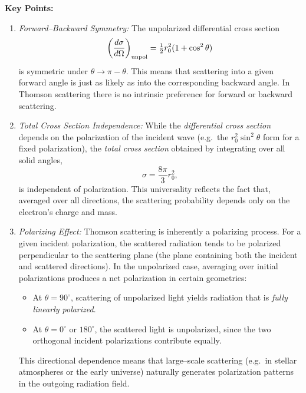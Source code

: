 \begin{remark}
    \textbf{Key Points:}
    \begin{enumerate}
        \item \emph{Forward--Backward Symmetry:}  
              The unpolarized differential cross section
              \[
                  \left(\frac{d\sigma}{d\Omega}\right)_{\rm unpol}
                  = \tfrac{1}{2} r_0^2 (1 + \cos^2\theta)
              \]
              is symmetric under $\theta \to \pi - \theta$. This means
              that scattering into a given forward angle is just as
              likely as into the corresponding backward angle. In
              Thomson scattering there is no intrinsic preference for
              forward or backward scattering.

        \item \emph{Total Cross Section Independence:}  
              While the \emph{differential cross section} depends on the
              polarization of the incident wave (e.g.~the
              $r_0^2 \sin^2\theta$ form for a fixed polarization),
              the \emph{total cross section} obtained by integrating over
              all solid angles,
              \[
                  \sigma = \frac{8\pi}{3}r_0^2,
              \]
              is independent of polarization. This universality reflects
              the fact that, averaged over all directions, the scattering
              probability depends only on the electron’s charge and mass.

        \item \emph{Polarizing Effect:}  
              Thomson scattering is inherently a polarizing process. For
              a given incident polarization, the scattered radiation
              tends to be polarized perpendicular to the scattering plane
              (the plane containing both the incident and scattered
              directions). In the unpolarized case, averaging over
              initial polarizations produces a net polarization in
              certain geometries:
              \begin{itemize}
                  \item At $\theta = 90^\circ$, scattering of unpolarized
                        light yields radiation that is \emph{fully
                        linearly polarized}.
                  \item At $\theta = 0^\circ$ or $180^\circ$, the
                        scattered light is unpolarized, since the two
                        orthogonal incident polarizations contribute
                        equally.
              \end{itemize}
              This directional dependence means that large--scale
              scattering (e.g.~in stellar atmospheres or the early
              universe) naturally generates polarization patterns in the
              outgoing radiation field.
    \end{enumerate}
\end{remark}

